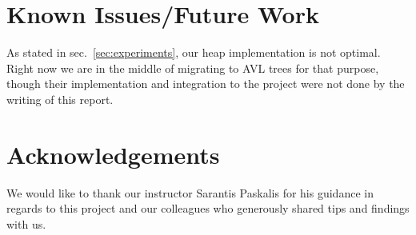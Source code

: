 \documentclass[
  10,
  letterpaperpaper,
  twocolumn]{article}
\begin{document}
\section{Known Issues/Future Work}\label{known-issuesfuture-work}

As stated in sec.~\ref{sec:experiments}, our heap implementation is not
optimal. Right now we are in the middle of migrating to AVL trees for
that purpose, though their implementation and integration to the project
were not done by the writing of this report.

\section{Acknowledgements}\label{acknowledgements}

We would like to thank our instructor Sarantis Paskalis for his guidance
in regards to this project and our colleagues who generously shared tips
and findings with us.

\printbibliography
\end{document}
